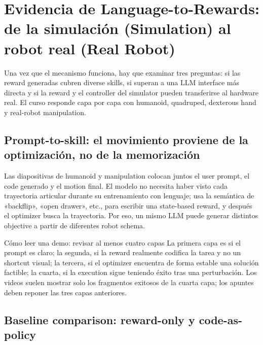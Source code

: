 \section{Evidencia de Language-to-Rewards: de la simulación (Simulation) al robot real (Real Robot)}

Una vez que el mecanismo funciona, hay que examinar tres preguntas: si las reward generadas cubren diverse skills, si superan a una LLM interface más directa y si la reward y el controller del simulator pueden transferirse al hardware real. El curso responde capa por capa con humanoid, quadruped, dexterous hand y real-robot manipulation.

\subsection{Prompt-to-skill: el movimiento proviene de la optimización, no de la memorización}

Las diapositivas de humanoid y manipulation colocan juntos el user prompt, el code generado y el motion final. El modelo no necesita haber visto cada trayectoria articular durante su entrenamiento con lenguaje; usa la semántica de «backflip», «open drawer», etc., para escribir una state-based reward, y después el optimizer busca la trayectoria. Por eso, un mismo LLM puede generar distintos objective a partir de diferentes robot schema.



\begin{knowledgebox}{Cómo leer una demo: revisar al menos cuatro capas}
La primera capa es si el prompt es claro; la segunda, si la reward realmente codifica la tarea y no un shortcut visual; la tercera, si el optimizer encuentra de forma estable una solución factible; la cuarta, si la execution sigue teniendo éxito tras una perturbación. Los videos suelen mostrar solo los fragmentos exitosos de la cuarta capa; los apuntes deben reponer las tres capas anteriores.
\end{knowledgebox}

\subsection{Baseline comparison: reward-only y code-as-policy}

